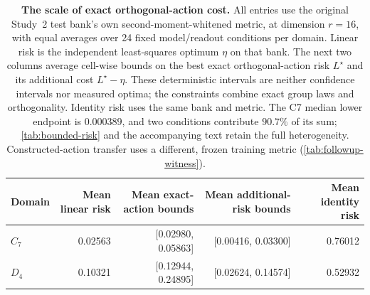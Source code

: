\begin{table}[t]
\centering\small
\setlength{\tabcolsep}{5pt}
\begin{tabular}{@{}lrrrr@{}}
\toprule
Domain & Mean linear risk & Mean exact-action bounds & Mean additional-risk bounds & Mean identity risk \\
\midrule
$C_7$ & 0.02563 & [0.02980, 0.05863] & [0.00416, 0.03300] & 0.76012 \\
$D_4$ & 0.10321 & [0.12944, 0.24895] & [0.02624, 0.14574] & 0.52932 \\
\bottomrule
\end{tabular}
\caption{\textbf{The scale of exact orthogonal-action cost.} All entries use the original Study~2 test bank's own second-moment-whitened metric, at dimension $r=16$, with equal averages over 24 fixed model/readout conditions per domain. Linear risk is the independent least-squares optimum $\eta$ on that bank. The next two columns average cell-wise bounds on the best exact orthogonal-action risk $L^\star$ and its additional cost $L^\star-\eta$. These deterministic intervals are neither confidence intervals nor measured optima; the constraints combine exact group laws and orthogonality. Identity risk uses the same bank and metric. The C7 median lower endpoint is $0.000389$, and two conditions contribute $90.7\%$ of its sum; \cref{tab:bounded-risk} and the accompanying text retain the full heterogeneity. Constructed-action transfer uses a different, frozen training metric (\cref{tab:followup-witness}).}
\label{tab:core-risk-summary}
\end{table}
